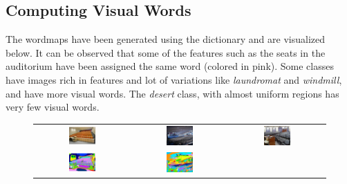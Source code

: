 \documentclass[a4paper]{article}
\begin{document}
\subsection{Computing Visual Words}
The wordmaps have been generated using the dictionary and are visualized below. It can be observed that some of the features such as the seats in the auditorium have been assigned the same word (colored in pink). Some classes have images rich in features and lot of variations like \textit{laundromat} and \textit{windmill}, and have more visual words. The \textit{desert} class, with almost uniform regions has very few visual words.

\begin{figure}[!ht]
\centering
\begin{tabular}{ccc}
{\includegraphics[width=0.3\textwidth]{auditorium}} &
{\includegraphics[width=0.3\textwidth]{audi2}} &
{\includegraphics[width=0.3\textwidth]{audi3}} \\
{\includegraphics[width=0.3\textwidth]{auditorium_wordmap}} &
{\includegraphics[width=0.3\textwidth]{audi2_wordmap}} &

\end{tabular}
\end{figure}
\end{document}
